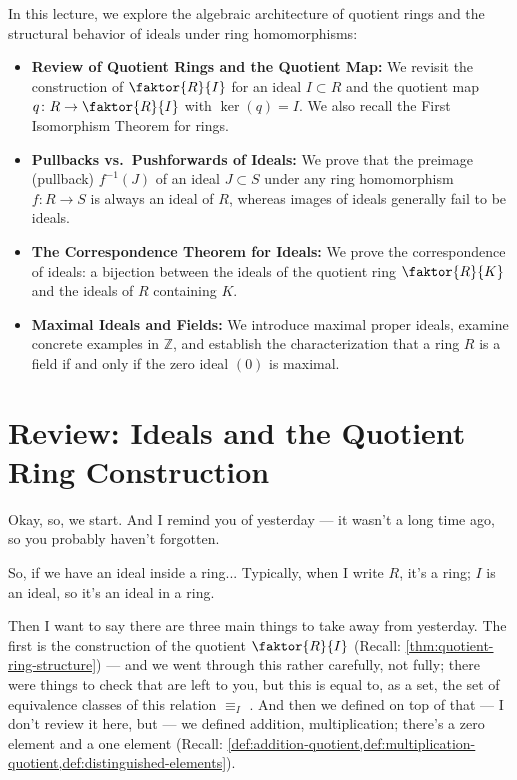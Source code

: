 \begin{overview}
In this lecture, we explore the algebraic architecture of quotient rings and the structural behavior of ideals under ring homomorphisms:
\begin{itemize}
    \item \textbf{Review of Quotient Rings and the Quotient Map:} We revisit the construction of $\faktor{R}{I}$ for an ideal $I \subset R$ and the quotient map $q \colon R \to \faktor{R}{I}$ with $\ker(q) = I$. We also recall the First Isomorphism Theorem for rings.
    \item \textbf{Pullbacks vs.\ Pushforwards of Ideals:} We prove that the preimage (pullback) $f^{-1}(J)$ of an ideal $J \subset S$ under any ring homomorphism $f \colon R \to S$ is always an ideal of $R$, whereas images of ideals generally fail to be ideals.
    \item \textbf{The Correspondence Theorem for Ideals:} We prove the correspondence of ideals: a bijection between the ideals of the quotient ring $\faktor{R}{K}$ and the ideals of $R$ containing $K$.
    \item \textbf{Maximal Ideals and Fields:} We introduce maximal proper ideals, examine concrete examples in $\mathbb{Z}$, and establish the characterization that a ring $R$ is a field if and only if the zero ideal $(0)$ is maximal.
\end{itemize}
\end{overview}

\section{Review: Ideals and the Quotient Ring Construction}

\begin{speech}[00:00:05 - 00:01:10]
Okay, so, we start. And I remind you of yesterday --- it wasn't a long time ago, so you probably haven't forgotten.

So, if we have an ideal inside a ring... Typically, when I write $R$, it's a ring; $I$ is an ideal, so it's an ideal  in a ring.

Then I want to say there are three main things to take away from yesterday. The first  is the construction of the quotient $\faktor{R}{I}$ (Recall: \cref{thm:quotient-ring-structure}) --- and we went through this rather carefully, not fully; there were things to check that are left to you, but this is equal to, as a set, the set of equivalence classes of this relation $\equiv_I$ . And then we defined on top of that --- I don't review it here, but --- we defined addition, multiplication; there's a zero element and a one element (Recall: \cref{def:addition-quotient,def:multiplication-quotient,def:distinguished-elements}). 
\end{speech}

